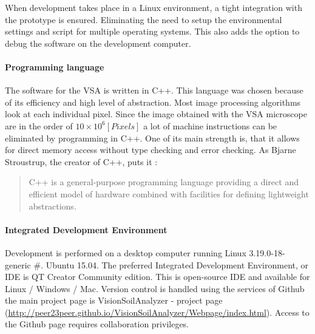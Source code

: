 \documentclass[11pt,fleqn,,a4paper,twoside,openright]{book}
\begin{document}
When development takes place in a Linux environment, a tight integration with the prototype is ensured. Eliminating the need to setup the environmental settings and script for multiple operating systems. This also adds the option to debug the software on the development computer. 

\paragraph{Programming language}
The software for the VSA is written in C++. This language was chosen because of its efficiency and high level of abstraction. Most image processing algorithms look at each individual pixel. Since the image obtained with the VSA microscope are in the order of $ 10 \times 10^6 [Pixels]$ a lot of machine instructions can be eliminated by programming in C++. One of its main strength is, that it allows for direct memory access without type checking and error checking. As Bjarne Stroustrup, the creator of C++, puts it \citeauthor{_c++_2013} \cite{_c++_2013} : \begin{quote}
	C++ is a general-purpose programming language providing a direct and efficient model of hardware combined with facilities for defining lightweight abstractions.
\end{quote}

\paragraph{Integrated Development Environment}
Development is performed on a desktop computer running Linux 3.19.0-18-generic \#. Ubuntu 15.04. The preferred Integrated Development Environment, or IDE is QT Creator Community edition. This is open-source IDE and available for Linux / Windows / Mac. Version control is handled using the services of Github the main project page is VisionSoilAnalyzer - project page (\url{http://peer23peer.github.io/VisionSoilAnalyzer/Webpage/index.html}). Access to the Github page requires collaboration privileges.
\end{document}
